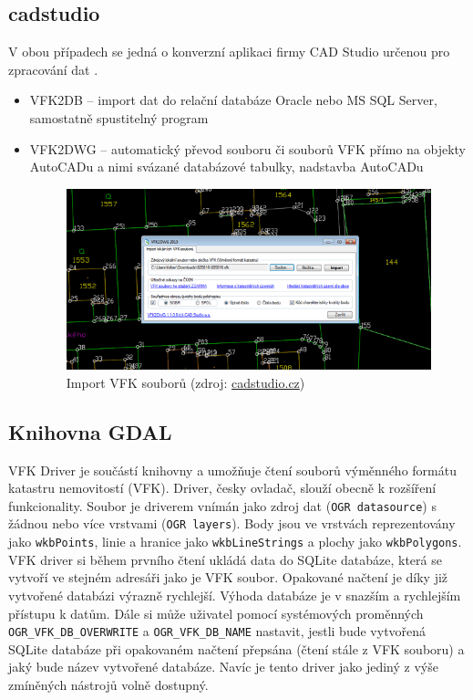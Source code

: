 \subsection{cadstudio}
V obou případech se jedná o konverzní aplikaci firmy CAD Studio
určenou pro zpracování dat .
\begin{itemize}[leftmargin=50pt]
\item VFK2DB -- import dat do relační databáze Oracle nebo MS SQL Server, samostatně spustitelný program \cite{vfk2db} %
\item VFK2DWG -- automatický převod souboru či souborů VFK přímo na objekty AutoCADu a nimi svázané databázové tabulky, nadstavba AutoCADu \cite{vfk2dwg}

\begin{figure}[H]
	 \centering
      \includegraphics[width=14cm]{./pictures/vfk2dwg.png}
      \caption{Import VFK souborů (zdroj:
\href{http://www.cadstudio.cz/img/vfk2dwg11.gif}{cadstudio.cz})}
      \label{fig:cadstudio}
  \end{figure}
\end{itemize}
\subsection{Knihovna GDAL}
\label{subsec:gdal_vfk}
VFK Driver je součástí knihovny  a umožňuje čtení souborů
výměnného formátu katastru nemovitostí (VFK). Driver, česky ovladač,
slouží obecně k rozšíření funkcionality. Soubor  je driverem
vnímán jako zdroj dat (\verb|OGR datasource|) s žádnou nebo více
vrstvami (\verb|OGR layers|). Body jsou ve vrstvách reprezentovány
jako \verb|wkbPoints|, linie a hranice jako \verb|wkbLineStrings| a
plochy jako \verb|wkbPolygons|. VFK driver si během prvního čtení
ukládá data do SQLite databáze, která se vytvoří ve stejném adresáři
jako je VFK soubor. Opakované načtení je díky již vytvořené databázi
výrazně rychlejší. Výhoda databáze je v snazším a rychlejším přístupu
k datům. Dále si může uživatel pomocí systémových proměnných
\verb|OGR_VFK_DB_OVERWRITE| a \verb|OGR_VFK_DB_NAME| nastavit, jestli
bude vytvořená SQLite databáze při opakovaném načtení přepsána (čtení
stále z VFK souboru) a jaký bude název vytvořené databáze. Navíc je
tento driver jako jediný z výše zmíněných nástrojů volně
dostupný. \cite{vfk_driver}

